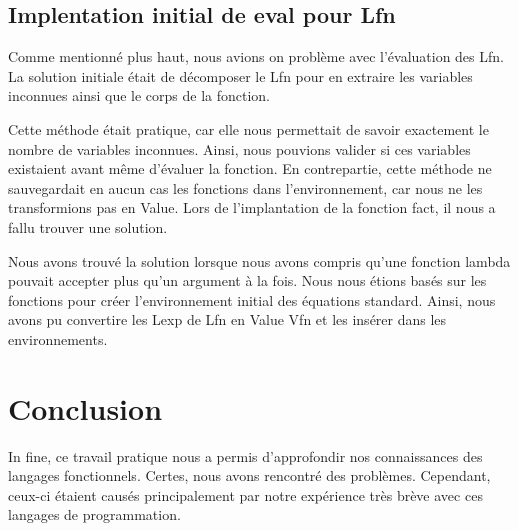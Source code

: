 \documentclass[12pt, letterpaper]{article}
\begin{document}
\subsection*{Implentation initial de eval pour Lfn}

Comme mentionné plus haut, nous avions on problème avec l'évaluation des Lfn. 
La solution initiale était de décomposer le Lfn pour en extraire les variables 
inconnues ainsi que le corps de la fonction.

Cette méthode était pratique, car elle nous permettait de savoir exactement le
nombre de variables inconnues. Ainsi, nous pouvions valider si ces variables 
existaient avant même d'évaluer la fonction. En contrepartie, cette méthode 
ne sauvegardait en aucun cas les fonctions dans l'environnement, car nous ne 
les transformions pas en Value. Lors de l'implantation de la fonction fact,
il nous a fallu trouver une solution.

Nous avons trouvé la solution lorsque nous avons compris qu'une fonction lambda
pouvait accepter plus qu'un argument à la fois. Nous nous étions basés sur les 
fonctions pour créer l'environnement initial des équations standard.
Ainsi, nous avons pu convertire les Lexp de Lfn en Value Vfn et les insérer 
dans les environnements.

\pagebreak

\section*{Conclusion}

In fine, ce travail pratique nous a permis d'approfondir nos connaissances 
des langages fonctionnels. Certes, nous avons rencontré des problèmes. 
Cependant, ceux-ci étaient causés principalement par notre expérience très brève 
avec ces langages de programmation.  
\end{document}
